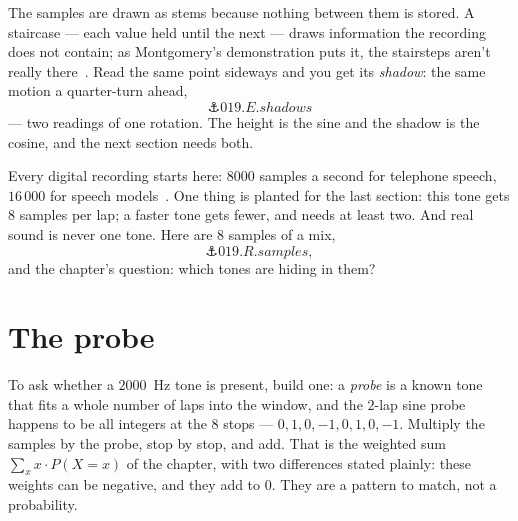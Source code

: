 \begin{narrative}
The samples are drawn as stems because nothing between them is stored.
A staircase — each value held until the next — draws information the
recording does not contain; as Montgomery's demonstration puts it, the
stairsteps aren't really
there~\cite{signal_processing-montgomery-digital-show-and-tell-2013}.
Read the same point sideways and you get its \emph{shadow}: the same
motion a quarter-turn ahead,
\[
  \anchor{019.E.shadows}
\]
— two readings of one rotation. The height is the sine and the shadow
is the cosine, and the next section needs both.

Every digital recording starts here: $8000$ samples a second for
telephone speech, $16\,000$ for speech
models~\cite{signal_processing-jurafsky-martin-speech-and-language-processing-ch-15}.
One thing is planted for the last section: this tone gets $8$ samples
per lap; a faster tone gets fewer, and needs at least two. And real
sound is never one tone. Here are $8$ samples of a mix,
\[
  \anchor{019.R.samples},
\]
and the chapter's question: which tones are hiding in them?

\section{The probe}

To ask whether a $2000$~Hz tone is present, build one: a \emph{probe} is
a known tone that fits a whole number of laps into the window, and the
$2$-lap sine probe happens to be all integers at the $8$ stops — $0, 1,
0, -1, 0, 1, 0, -1$. Multiply the samples by the probe, stop by stop,
and add. That is the weighted sum $\sum_x x \cdot P(X = x)$ of the
 chapter, with two differences stated plainly: these
weights can be negative, and they add to $0$. They are a pattern to
match, not a probability.


\end{narrative}
